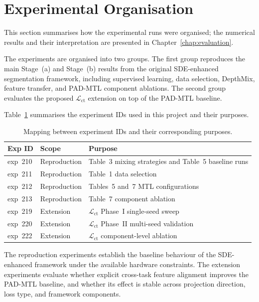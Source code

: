 \section{Experimental Organisation}
\label{sec:experiment-organisation}

This section summarises how the experimental runs were organised; the
numerical results and their interpretation are presented in
Chapter~\ref{chap:evaluation}.

The experiments are organised into two groups. The first group reproduces
the main Stage~(a) and Stage~(b) results from the original SDE-enhanced
segmentation framework, including supervised learning, data selection,
DepthMix, feature transfer, and PAD-MTL component ablations. The second
group evaluates the proposed $\mathcal{L}_\text{ct}$ extension on top of
the PAD-MTL baseline.

Table~\ref{tab:exp-id-mapping} summarises the experiment IDs used in this
project and their purposes.

\begin{table}[H]
\centering
\caption{Mapping between experiment IDs and their corresponding purposes.}
\label{tab:exp-id-mapping}
\small
\begin{tabular}{lll}
\toprule
\textbf{Exp ID} & \textbf{Scope} & \textbf{Purpose} \\
\midrule
exp~210 & Reproduction & Table~3 mixing strategies and Table~5 baseline runs \\
exp~211 & Reproduction & Table~1 data selection \\
exp~212 & Reproduction & Tables~5 and~7 MTL configurations \\
exp~213 & Reproduction & Table~7 component ablation \\
exp~219 & Extension    & $\mathcal{L}_\text{ct}$ Phase~I single-seed sweep \\
exp~220 & Extension    & $\mathcal{L}_\text{ct}$ Phase~II multi-seed validation \\
exp~222 & Extension    & $\mathcal{L}_\text{ct}$ component-level ablation \\
\bottomrule
\end{tabular}
\end{table}

The reproduction experiments establish the baseline behaviour of the
SDE-enhanced framework under the available hardware constraints. The
extension experiments evaluate whether explicit cross-task feature
alignment improves the PAD-MTL baseline, and whether its effect is stable
across projection direction, loss type, and framework components.

